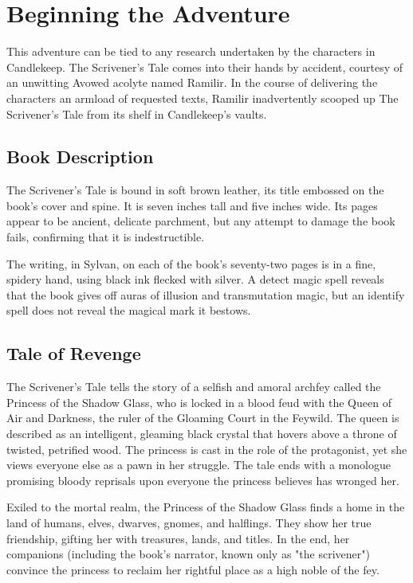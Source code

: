\documentclass[10pt,a4paper,twoside,bg=print,twocolumn,openany,nodeprecatedcode]{dndbook}
\begin{document}
\section{Beginning the Adventure}
This adventure can be tied to any research undertaken by the characters in Candlekeep. The Scrivener's Tale comes into their hands by accident, courtesy of an unwitting Avowed acolyte named Ramilir. In the course of delivering the characters an armload of requested texts, Ramilir inadvertently scooped up The Scrivener's Tale from its shelf in Candlekeep's vaults.

\subsection{Book Description}
The Scrivener's Tale is bound in soft brown leather, its title embossed on the book's cover and spine. It is seven inches tall and five inches wide. Its pages appear to be ancient, delicate parchment, but any attempt to damage the book fails, confirming that it is indestructible.

The writing, in Sylvan, on each of the book's seventy-two pages is in a fine, spidery hand, using black ink flecked with silver. A detect magic spell reveals that the book gives off auras of illusion and transmutation magic, but an identify spell does not reveal the magical mark it bestows.

\subsection{Tale of Revenge}
The Scrivener's Tale tells the story of a selfish and amoral archfey called the Princess of the Shadow Glass, who is locked in a blood feud with the Queen of Air and Darkness, the ruler of the Gloaming Court in the Feywild. The queen is described as an intelligent, gleaming black crystal that hovers above a throne of twisted, petrified wood. The princess is cast in the role of the protagonist, yet she views everyone else as a pawn in her struggle. The tale ends with a monologue promising bloody reprisals upon everyone the princess believes has wronged her.

Exiled to the mortal realm, the Princess of the Shadow Glass finds a home in the land of humans, elves, dwarves, gnomes, and halflings. They show her true friendship, gifting her with treasures, lands, and titles. In the end, her companions (including the book's narrator, known only as "the scrivener") convince the princess to reclaim her rightful place as a high noble of the fey.
\end{document}
